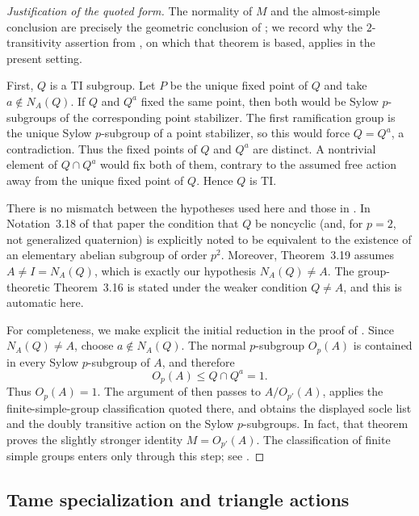\documentclass[11pt]{amsart}
\theoremstyle{remark}
\begin{document}
\begin{proof}[Justification of the quoted form]
The normality of $M$ and the almost-simple conclusion are precisely the
geometric conclusion of \cite[Theorem~3.19]{GMP}; we record why the
$2$-transitivity assertion from \cite[Theorem~3.16]{GMP}, on which that
theorem is based, applies in the present setting.

First, $Q$ is a TI subgroup. Let $P$ be the unique fixed point of $Q$
and take $a\notin N_A(Q)$. If $Q$ and $Q^a$ fixed the same point, then
both would be Sylow $p$-subgroups of the corresponding point
stabilizer. The first ramification group is the unique Sylow
$p$-subgroup of a point stabilizer, so this would force $Q=Q^a$, a
contradiction. Thus the fixed points of $Q$ and $Q^a$ are distinct. A
nontrivial element of $Q\cap Q^a$ would fix both of them, contrary to
the assumed free action away from the unique fixed point of $Q$. Hence
$Q$ is TI.

There is no mismatch between the hypotheses used here and those in
\cite{GMP}. In Notation~3.18 of that paper the condition that $Q$ be
noncyclic (and, for $p=2$, not generalized quaternion) is explicitly
noted to be equivalent to the existence of an elementary abelian
subgroup of order $p^2$. Moreover, Theorem~3.19 assumes
$A\ne I=N_A(Q)$, which is exactly our hypothesis $N_A(Q)\ne A$.
The group-theoretic Theorem~3.16 is stated under the weaker condition
$Q\ne A$, and this is automatic here.

For completeness, we make explicit the initial reduction in the proof
of \cite[Theorem~3.16]{GMP}. Since $N_A(Q)\ne A$, choose
$a\notin N_A(Q)$. The normal $p$-subgroup $O_p(A)$ is contained in
every Sylow $p$-subgroup of $A$, and therefore
\[
        O_p(A)\le Q\cap Q^a=1.
\]
Thus $O_p(A)=1$. The argument of \cite[Theorem~3.16]{GMP} then passes
to $A/O_{p'}(A)$, applies the finite-simple-group classification quoted
there, and obtains the displayed socle list and the doubly transitive
action on the Sylow $p$-subgroups. In fact, that theorem proves the
slightly stronger identity $M=O_{p'}(A)$. The classification of finite
simple groups enters only through this step; see
\cite[Remark~3.17]{GMP}.
\end{proof}

\subsection{Tame specialization and triangle actions}\label{subsec:tame-specialization}
\end{document}
